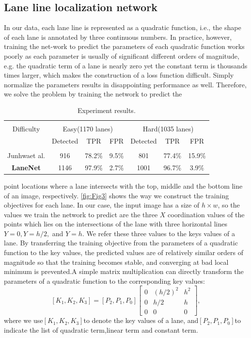\documentclass[10pt,twocolumn,letterpaper]{article}
\begin{document}
\subsection{Lane line localization network}

In our data, each lane line is represented as a quadratic function, i.e., the shape of each lane is annotated by three continuous numbers. In practice, however, training the net-work to predict the parameters of each quadratic function works poorly as each parameter is usually of significant different  orders  of  magnitude,  e.g.   the  quadratic  term  of  a lane is nearly zero yet the constant term is thousands times larger, which makes the construction of a loss function difficult. Simply normalize the parameters results in disappointing performance as well.  Therefore, we solve the problem by training the network to predict the 
\begin{table}[H]
    \centering
    \begin{tabular}{c|c|c|c|c|c|c}
        \hline \\
         Difficulty & \multicolumn{3}{c}{Easy(1170 lanes)} & \multicolumn{3}{c}{Hard(1035 lanes)} \\
         & Detected & TPR & FPR & Detected & TPR & FPR \\
         \hline\\
         Junhwaet al.\cite{6_} & 916 & 78.2\% & 9.5\% & 801 & 77.4\% & 15.9\% \\
         \textbf{LaneNet} & 1146 & 97.9\% & 2.7\% & 1001 & 96.7\% & 3.9\% \\
         \hline
    \end{tabular}
    \caption{Experiment results.}
    \label{tab:Tab1}
\end{table}
point locations where a lane intersects with the top, middle and the bottom line of an image, respectively.  \cref{fig:Fig3} shows the way we construct the training objectives for each lane.  In our case, the input image has a size of $h \times w$, so the values we train the network to predict are the three $X$ coordination values of the points which lies on the intersections of the lane with three horizontal lines $Y= 0,Y=h/2, $ and $ Y=h$.  We refer these three values to the keys values of a lane. By transferring the training objective from the parameters of a quadratic function to the key values, the predicted values are of relatively similar  orders  of  magnitude  so  that  the  training  becomes stable, and converging at bad local minimum is prevented.A simple matrix multiplication can directly transform the parameters of a quadratic function to the corresponding key values:
\begin{equation}
    \left[K_{1},K_{2},K_{3}\right] = \left[P_{2},P_{1},P_{0}\right]\left[\begin{array}{ccc}
         0 & (h/2)^2 & h^2  \\
         0 & h/2 & h \\
         0 & 0 & 0
    \end{array}\right] ,
\end{equation}
where we use$\left[K_{1},K_{2},K_{3}\right]$to denote the key values of a lane, and$\left[P_{2},P_{1},P_{0}\right]$to indicate the list of quadratic term,linear term and constant term.
\end{document}
